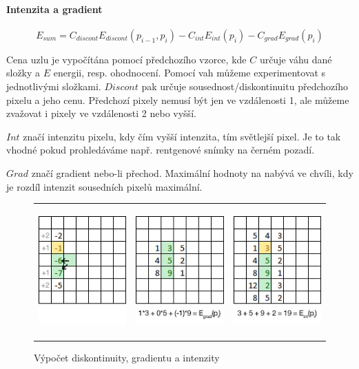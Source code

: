 \documentclass[12pt,a4paper,titlepage,final]{report}
\begin{document}
\paragraph{Intenzita a gradient}
$$ E_{sum} = C_{discont}E_{discont}(p_{i-1},p_{i})-C_{int}E_{int}(p_{i})-C_{grad}E_{grad}(p_{i}) $$

Cena uzlu je vypočítána pomocí předchozího vzorce, kde $C$ určuje váhu dané složky a $E$ energii, resp. ohodnocení. Pomocí vah můžeme experimentovat s jednotlivými složkami. $Discont$ pak určuje sousednost/diskontinuitu předchozího pixelu a jeho cenu. Předchozí pixely nemusí být jen ve vzdálenosti 1, ale můžeme zvažovat i pixely ve vzdálenosti 2 nebo vyšší.

$Int$ značí intenzitu pixelu, kdy čím vyšší intenzita, tím světlejší pixel. Je to tak vhodné pokud prohledáváme např. rentgenové snímky na černém pozadí.

$Grad$ značí gradient nebo-li přechod. Maximální hodnoty na nabývá ve chvíli, kdy je rozdíl intenzit sousedních pixelů maximální.

\begin{figure}[ht]
\begin{center}
		\begin{tabular}{lll}
			\includegraphics[height=50mm]{images/disc.jpg} &		
			\includegraphics[height=50mm]{images/grad.jpg} &
			\includegraphics[height=50mm]{images/int.jpg}
		\end{tabular}
		\caption{Výpočet diskontinuity, gradientu a intenzity}
		\label{fig:theory}
\end{center}
\end{figure}
\end{document}
